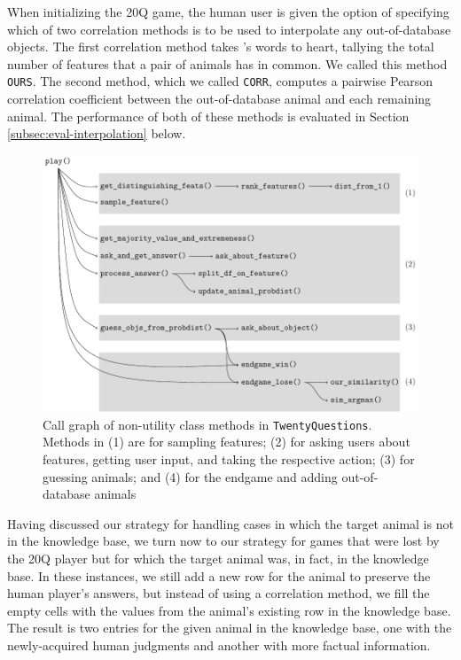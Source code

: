 \documentclass[11pt,a4paper]{article}
\begin{document}
When initializing the 20Q game, the human user is given the option of specifying which of two correlation methods is to be used to interpolate any out-of-database objects. 
The first correlation method takes \citeauthor{Rosch1978}'s \citeyearpar{Rosch1978} words to heart, tallying the total number of features that a pair of animals has in common. 
We called this method \texttt{OURS}. 
The second method, which we called \texttt{CORR}, computes a pairwise Pearson correlation coefficient between the out-of-database animal and each remaining animal. 
The performance of both of these methods is evaluated in Section \ref{subsec:eval-interpolation} below.

\begin{figure}[htbp!]
\centering
	\includegraphics[width=.9\linewidth]{graphics/call_graph.pdf}
	\caption{Call graph of non-utility class methods in \texttt{TwentyQuestions}. Methods in (1) are for sampling features; (2) for asking users about features, getting user input, and taking the respective action; (3) for guessing animals; and (4) for the endgame and adding out-of-database animals}
	\label{fig:call-graph}
\end{figure}

Having discussed our strategy for handling cases in which the target animal is not in the knowledge base, we turn now to our strategy for games that were lost by the 20Q player but for which the target animal was, in fact, in the knowledge base. 
In these instances, we still add a new row for the animal to preserve the human player's answers, but instead of using a correlation method, we fill the empty cells with the values from the animal's existing row in the knowledge base. 
The result is two entries for the given animal in the knowledge base, one with the newly-acquired human judgments and another with more factual information. 
\end{document}
